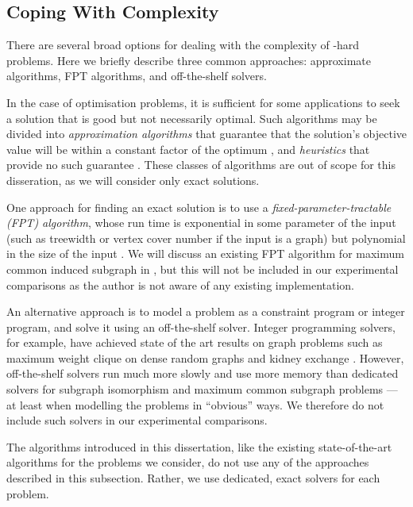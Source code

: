\subsection{Coping With Complexity}

There are several broad options for dealing with the complexity of \NP-hard problems.
Here we briefly describe three common approaches: approximate algorithms, FPT
algorithms, and off-the-shelf solvers.

In the case of optimisation problems, it is sufficient for some applications to
seek a solution that is good but not necessarily optimal.
Such algorithms may be divided into \emph{approximation algorithms}
that guarantee that the solution's objective value will be within a constant factor
of the optimum \citep{DBLP:books/daglib/0004338}, and \emph{heuristics}
that provide no such guarantee \citep{talbi2009metaheuristics}.
These classes of algorithms are out of scope for this disseration, as we will
consider only exact solutions.

One approach for finding an exact solution is to use a \emph{fixed-parameter-tractable
(FPT) algorithm}, whose run time is exponential in some parameter of the input
(such as treewidth or vertex cover number if the input is a graph) but polynomial
in the size of the input \citep{DBLP:books/ox/Niedermeier06}.
We will discuss an existing FPT algorithm for maximum common induced subgraph
in , but this will not be included in our experimental
comparisons as the author is not aware of any existing implementation.

An alternative approach is to model a problem as a constraint program or integer
program, and solve it using an off-the-shelf solver.
Integer programming solvers, for example,
have achieved state of the art results on graph problems such as maximum
weight clique on dense random graphs \citep{DBLP:journals/cor/SegundoFA19}
and kidney exchange \citep{DBLP:conf/sigecom/DickersonMPST16}.
However, off-the-shelf solvers run much more slowly and use more memory
than dedicated solvers for subgraph isomorphism and maximum common subgraph
problems
\citep{mccreesh2017solving,trimble2018three} --- at least
when modelling the problems in ``obvious'' ways. We therefore do
not include such solvers in our experimental comparisons.

The algorithms introduced in this dissertation, like the existing state-of-the-art
algorithms for the problems we consider, do not use any of the approaches
described in this subsection.
Rather, we use dedicated, exact solvers for each problem.


